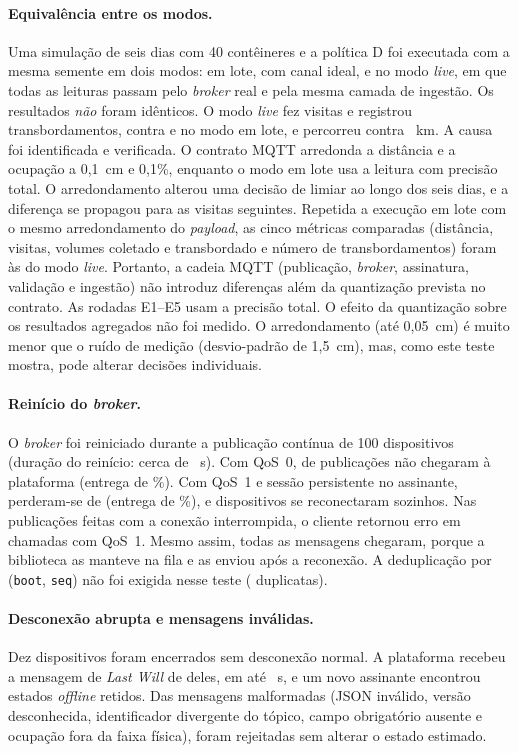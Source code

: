 \paragraph{Equivalência entre os modos.}
Uma simulação de seis dias com 40 contêineres e a política D foi executada
com a mesma semente em dois modos: em lote, com canal ideal, e no modo
\emph{live}, em que todas as leituras passam pelo \emph{broker} real e pela
mesma camada de ingestão. Os resultados \emph{não} foram idênticos. O modo
\emph{live} fez \EquivVisLive{} visitas e registrou \EquivOvLive{}
transbordamentos, contra \EquivVisLote{} e \EquivOvLote{} no modo em lote, e
percorreu \EquivKmLive{} contra \EquivKmLote{}~km. A causa foi identificada
e verificada. O contrato MQTT arredonda a distância e a ocupação a 0,1~cm e
0,1\%, enquanto o modo em lote usa a leitura com precisão total. O
arredondamento alterou uma decisão de limiar ao longo dos seis dias, e a
diferença se propagou para as visitas seguintes. Repetida a execução em lote
com o mesmo arredondamento do \emph{payload}, as cinco métricas comparadas
(distância, visitas, volumes coletado e transbordado e número de
transbordamentos) foram \EquivQuant{} às do modo \emph{live}. Portanto, a
cadeia MQTT (publicação, \emph{broker}, assinatura, validação e ingestão) não
introduz diferenças além da quantização prevista no contrato. As rodadas
E1--E5 usam a precisão total. O efeito da quantização sobre os resultados
agregados não foi medido. O arredondamento (até 0,05~cm) é muito menor que o
ruído de medição (desvio-padrão de 1,5~cm), mas, como este teste mostra, pode
alterar decisões individuais.

\paragraph{Reinício do \emph{broker}.}
O \emph{broker} foi reiniciado durante a publicação contínua de 100
dispositivos (duração do reinício: cerca de \RestartDurUm{}~s). Com QoS~0,
\RestartLostZero{} de \RestartPubZero{} publicações não chegaram à
plataforma (entrega de \RestartDelivZero\%). Com QoS~1 e sessão persistente
no assinante, perderam-se \RestartLostUm{} de \RestartPubUm{} (entrega de
\RestartDelivUm\%), e \RestartReconUm{} dispositivos se reconectaram
sozinhos. Nas publicações feitas com a conexão interrompida, o cliente
retornou erro em \RestartPubFailUm{} chamadas com QoS~1. Mesmo assim, todas as
mensagens chegaram, porque a biblioteca as manteve na fila e as enviou após a
reconexão. A deduplicação por (\texttt{boot}, \texttt{seq}) não foi exigida
nesse teste (\RestartDupUm{} duplicatas).

\paragraph{Desconexão abrupta e mensagens inválidas.}
Dez dispositivos foram encerrados sem desconexão normal. A plataforma recebeu
a mensagem de \emph{Last Will} de \LwtDetected{} deles, em até \LwtTime{}~s,
e um novo assinante encontrou \LwtRetained{} estados \emph{offline} retidos. Das
\MalSent{} mensagens malformadas (JSON inválido, versão desconhecida,
identificador divergente do tópico, campo obrigatório ausente e ocupação fora
da faixa física), \MalRejected{} foram rejeitadas sem alterar o estado
estimado.

